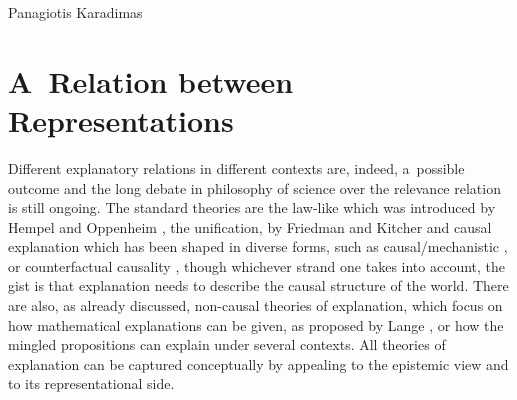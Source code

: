 \begin{artengenv}{Panagiotis Karadimas}
\section{A~Relation between Representations}
Different explanatory relations in different contexts are, indeed, a~possible outcome and the long debate in philosophy of science over the relevance relation is still ongoing. The standard theories are the law-like which was introduced by Hempel and Oppenheim
\parencite*[][]{hempel_studies_1948}, %
 the unification, by Friedman 
\parencite*[][]{friedman_explanation_1974} %
 and Kitcher 
\parencite*[][]{kitcher_explanatory_1981} %
 and causal explanation which has been shaped in diverse forms, such as causal/mechanistic 
\parencites[][]{salmon_scientific_1984}[][]{machamer_thinking_2000}, %
 or counterfactual causality 
\parencite[][]{Woodward2002}, %
 though whichever strand one takes into account, the gist is that explanation needs to describe the causal structure of the world. There are also, as already discussed, non-causal theories of explanation, which focus on how mathematical explanations can be given, as proposed by Lange 
\parencite*[][]{lange_what_2013}, %
 or how the mingled propositions can explain under several contexts. All theories of explanation can be captured conceptually by appealing to the epistemic view and to its representational side.


\end{artengenv}

